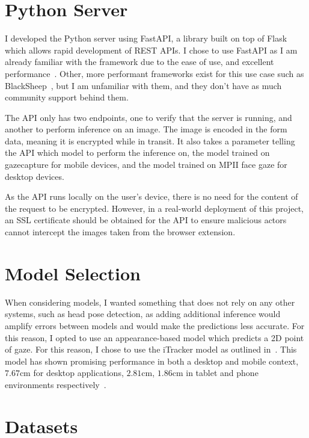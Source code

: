 \documentclass[twocolumn]{report}
\begin{document}
\section{Python Server}

I developed the Python server using FastAPI, a library built on top of Flask which allows rapid development of REST APIs. I chose to use FastAPI as I am already familiar with the framework due to the ease of use, and excellent performance~\cite{klenov2015benchmark}. Other, more performant frameworks exist for this use case such as BlackSheep~\cite{prevato2018blacksheep}, but I am unfamiliar with them, and they don't have as much community support behind them.  

The API only has two endpoints, one to verify that the server is running, and another to perform inference on an image. The image is encoded in the form data, meaning it is encrypted while in transit. It also takes a parameter telling the API which model to perform the inference on, the model trained on gazecapture for mobile devices, and the model trained on MPII face gaze for desktop devices. 

As the API runs locally on the user's device, there is no need for the content of the request to be encrypted. However, in a real-world deployment of this project, an SSL certificate should be obtained for the API to ensure malicious actors cannot intercept the images taken from the browser extension. 


\section{Model Selection}

When considering models, I wanted something that does not rely on any other systems, such as head pose detection, as adding additional inference would amplify errors between models and would make the predictions less accurate. For this reason, I opted to use an appearance-based model which predicts a 2D point of gaze. For this reason, I chose to use the iTracker model as outlined in~\cite{krafka2016eye}. This model has shown promising performance in both a desktop and mobile context, \(7.67\text{cm}\) for desktop applications, \(2.81\text{cm}\), \(1.86\text{cm}\) in tablet and phone environments respectively~\cite{cheng2021survey}.

\section{Datasets}
\end{document}
